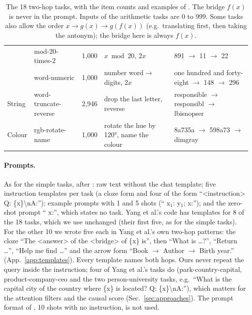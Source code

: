 \documentclass[10pt,a4paper]{article}
\begin{document}
\begin{table}[tbp]
\begin{tabularx}{\textwidth}{@{}llr>{\raggedright\arraybackslash}p{3.6cm}L@{}}
 & mod-20-times-2 & 1{,}000 & $x \bmod 20$, $2x$ & 891 $\to$ 11 $\to$ 22 \\
 & word-numeric & 1{,}000 & number word$\to$digits, $2x$ & one hundred and forty-eight $\to$ 148 $\to$ 296 \\
\midrule
String & word-truncate-reverse & 2{,}946 & drop the last letter, reverse & responsible $\to$ responsibl $\to$ lbisnopser \\
\midrule
Colour & rgb-rotate-name & 1{,}000 & rotate the hue by 120°, name the colour & 8a735a $\to$ 598a73 $\to$ dimgray \\
\bottomrule
\end{tabularx}
\caption{The 18 two-hop tasks, with the item counts and examples of \citet[Table~1]{khandelwal2026compose}. The bridge $f(x)$ is never in the prompt. Inputs of the arithmetic tasks are 0 to 999. Some tasks also allow the order $x \to g(x) \to g(f(x))$ (e.g.\ translating first, then taking the antonym); the bridge here is always $f(x)$.}
\label{tab:tasks}
\end{table}

\paragraph{Prompts.} As for the simple tasks, after \citet{yang2026shared}: raw text without the chat template; five instruction templates per task (a cloze form and four of the form ``\textless instruction\textgreater{} Q: \{x\}\textbackslash nA:''); example prompts with 1 and 5 shots (`` x$_1$: y$_1$; x:''); and the zero-shot prompt `` x:'', which states no task. Yang et al.'s code has templates for 8 of the 18 tasks, which we use unchanged (their first five, as for the simple tasks). For the other 10 we wrote five each in Yang et al.'s own two-hop patterns: the cloze ``The \textless answer\textgreater{} of the \textless bridge\textgreater{} of \{x\} is'', then ``What is \dots?'', ``Return \dots'', ``Help me find \dots'' and the arrow form ``Book $\rightarrow$ Author $\rightarrow$ Birth year.'' (App.~\ref{app:templates}). Every template names both hops. Ours never repeat the query inside the instruction; four of Yang et al.'s tasks do (park-country-capital, product-company-ceo and the two person-university tasks, e.g.\ ``What is the capital city of the country where \{x\} is located? Q: \{x\}\textbackslash nA:''), which matters for the attention filters and the causal score (Sec.~\ref{sec:approaches}). The prompt format of \citet{khandelwal2026compose}, 10 shots with no instruction, is not used.
\end{document}
